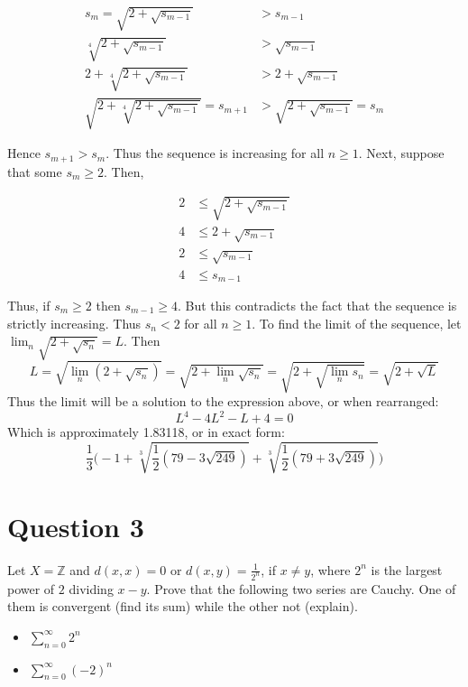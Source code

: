 \documentclass[12pt, letterpaper]{article}
\begin{document}
\begin{align*}
  s_m = \sqrt{2 + \sqrt{s_{m-1}}} &> s_{m-1}\\
  \sqrt[4]{2 + \sqrt{s_{m-1}}} &> \sqrt{s_{m-1}}\\
  2 + \sqrt[4]{2 + \sqrt{s_{m-1}}} &> 2 + \sqrt{s_{m-1}} \\
  \sqrt{2 + \sqrt[4]{2 + \sqrt{s_{m-1}}}} = s_{m + 1} &> \sqrt{2 + \sqrt{s_{m-1}}} = s_m
\end{align*}

Hence $s_{m + 1} > s_m$. Thus the sequence is increasing for all $n \geq 1$. Next, suppose that some $s_m \geq 2$. Then,

\begin{align*}
  2 &\leq \sqrt{2 + \sqrt{s_{m - 1}}}\\
  4 &\leq 2 + \sqrt{s_{m - 1}}\\
  2 &\leq \sqrt{s_{m - 1}} \\
  4 &\leq s_{m - 1}
\end{align*}

Thus, if $s_m \geq 2$ then $s_{m - 1} \geq 4$. But this contradicts the fact that the sequence is strictly increasing. Thus $s_n <2$ for all $n \geq 1$.
To find the limit of the sequence, let $\lim_n \sqrt{2+\sqrt{s_n}} = L$. Then
$$ L = \sqrt{\lim_n (2 + \sqrt{s_n})} = \sqrt{2 + \lim_n \sqrt{s_n}} = \sqrt{2 + \sqrt{\lim_n s_n}} = \sqrt{2 + \sqrt{L}} $$
Thus the limit will be a solution to the expression above, or when rearranged:
$$ L^4 - 4L^2 - L + 4 = 0 $$
Which is approximately 1.83118, or in exact form:
$$\frac{1}{3}\Big( -1 + \sqrt[3]{\frac{1}{2}(79 - 3\sqrt{249})} + \sqrt[3]{\frac{1}{2}(79 + 3\sqrt{249})} \Big)$$
\pagebreak

\section*{Question 3}
Let $X=\mathbb Z$ and $d(x,x)=0$ or $d(x,y)=\frac{1}{2^n}$, if $x\neq y$, where $2^n$ is the largest power of $2$ dividing $x-y$.
Prove that the following two series are Cauchy. One of them is convergent (find its sum) while the other not (explain).
\begin{itemize}
\item $\sum_{n=0}^{\infty} 2^n$
\item $\sum_{n=0}^{\infty} (-2)^n$
\end{itemize}
\end{document}
